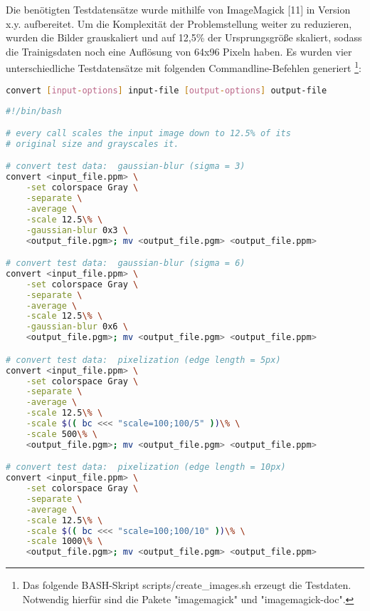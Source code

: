 \documentclass[
12pt, %
a4paper, %
oneside, %
headinclude,footinclude, %
BCOR5mm, %
german]{scrartcl}
\begin{document}
Die benötigten Testdatensätze wurde mithilfe von ImageMagick [11] in Version x.y. aufbereitet. Um die Komplexität der
Problemstellung weiter zu reduzieren, wurden die Bilder grauskaliert und auf 12,5\% der Ursprungsgröße skaliert, sodass
die Trainigsdaten noch eine Auflösung von 64x96 Pixeln haben. Es wurden vier unterschiedliche Testdatensätze mit
folgenden Commandline-Befehlen generiert \footnote{Das folgende BASH-Skript scripts/create\_images.sh erzeugt die
Testdaten. Notwendig hierfür sind die Pakete "imagemagick" und "imagemagick-doc".}:

\begin{lstlisting}[language=bash,caption={convert - Synopsis}]
convert [input-options] input-file [output-options] output-file
\end{lstlisting}

\begin{minipage}{\linewidth}
\begin{lstlisting}[language=bash,caption={Testdatenerstellung - Graustufen}]
#!/bin/bash

# every call scales the input image down to 12.5% of its
# original size and grayscales it.

# convert test data:  gaussian-blur (sigma = 3)
convert <input_file.ppm> \
    -set colorspace Gray \
    -separate \
    -average \
    -scale 12.5\% \
    -gaussian-blur 0x3 \
    <output_file.pgm>; mv <output_file.pgm> <output_file.ppm>

# convert test data:  gaussian-blur (sigma = 6)
convert <input_file.ppm> \
    -set colorspace Gray \
    -separate \
    -average \
    -scale 12.5\% \
    -gaussian-blur 0x6 \
    <output_file.pgm>; mv <output_file.pgm> <output_file.ppm>

# convert test data:  pixelization (edge length = 5px)
convert <input_file.ppm> \
    -set colorspace Gray \
    -separate \
    -average \
    -scale 12.5\% \
    -scale $(( bc <<< "scale=100;100/5" ))\% \
    -scale 500\% \
    <output_file.pgm>; mv <output_file.pgm> <output_file.ppm>

# convert test data:  pixelization (edge length = 10px)
convert <input_file.ppm> \
    -set colorspace Gray \
    -separate \
    -average \
    -scale 12.5\% \
    -scale $(( bc <<< "scale=100;100/10" ))\% \
    -scale 1000\% \
    <output_file.pgm>; mv <output_file.pgm> <output_file.ppm>
\end{lstlisting}
\end{minipage}
\end{document}
